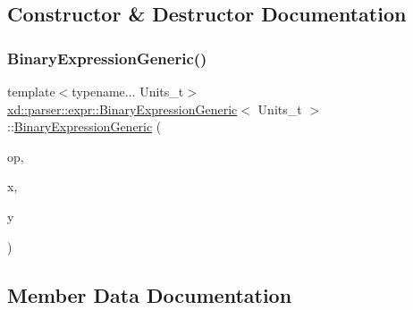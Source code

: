 \subsection{Constructor \& Destructor Documentation}
\mbox{\label{structxd_1_1parser_1_1expr_1_1_binary_expression_generic_a13688fc2568db01d54d15cc122a1226d}} 
\subsubsection{\texorpdfstring{Binary\+Expression\+Generic()}{BinaryExpressionGeneric()}}
{\footnotesize\ttfamily template$<$typename... Units\+\_\+t$>$ \\
\mbox{\hyperlink{structxd_1_1parser_1_1expr_1_1_binary_expression_generic}{xd\+::parser\+::expr\+::\+Binary\+Expression\+Generic}}$<$ Units\+\_\+t $>$\+::\mbox{\hyperlink{structxd_1_1parser_1_1expr_1_1_binary_expression_generic}{Binary\+Expression\+Generic}} (\begin{DoxyParamCaption}\item[{\mbox{\hyperlink{namespacexd_1_1parser_1_1expr_1_1op_a5d85beecf0ae4a43576fdeacb264886a}{op\+::\+Binary\+Operator}}}]{op,  }\item[{\mbox{\hyperlink{structxd_1_1parser_1_1expr_1_1_expression_generic}{Expression}}}]{x,  }\item[{\mbox{\hyperlink{structxd_1_1parser_1_1expr_1_1_expression_generic}{Expression}}}]{y }\end{DoxyParamCaption})\hspace{0.3cm}{\ttfamily [inline]}}



\subsection{Member Data Documentation}
\mbox{\label{structxd_1_1parser_1_1expr_1_1_binary_expression_generic_af5907465836fde213939e2842fa55cd2}} 
